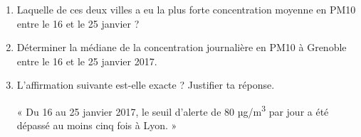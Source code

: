 \documentclass[a4paper]{book}
\begin{document}
{\begin{exercice}
        \begin{enumerate}
            \item Laquelle de ces deux villes a eu la plus forte concentration moyenne en PM10 entre le 16 et le 25 janvier ?   
        
            \item Déterminer la médiane de la concentration journalière en PM10 à Grenoble entre le 16 et le 25 janvier 2017.
        
            \item L'affirmation suivante est-elle exacte ? Justifier ta réponse.
        
            « Du 16 au 25 janvier 2017, le seuil d'alerte de 80 µg/m\textsuperscript{3} par jour a été dépassé au moins cinq fois à Lyon. »
        \end{enumerate}
    \end{exercice}

}
\end{document}

